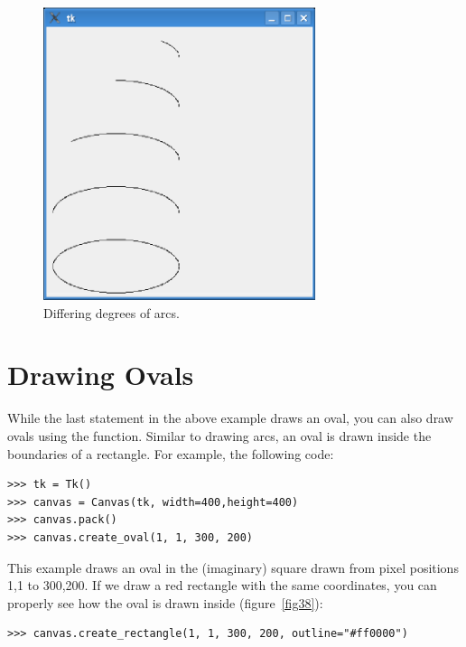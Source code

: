 \begin{figure}
\begin{center}
\includegraphics[width=80mm]{eps/figure37.eps}
\end{center}
\caption{Differing degrees of arcs.}\label{fig37}
\end{figure}

\section{Drawing Ovals}

While the last statement in the above example draws an oval, you can also draw ovals using the  function.  Similar to drawing arcs, an oval is drawn inside the boundaries of a rectangle. For example, the following code:

\begin{listing}
\begin{verbatim}
>>> tk = Tk()
>>> canvas = Canvas(tk, width=400,height=400)
>>> canvas.pack()
>>> canvas.create_oval(1, 1, 300, 200)
\end{verbatim}
\end{listing}

This example draws an oval in the (imaginary) square drawn from pixel positions 1,1 to 300,200. If we draw a red rectangle with the same coordinates, you can properly see how the oval is drawn inside (figure~\ref{fig38}):

\begin{listing}
\begin{verbatim}
>>> canvas.create_rectangle(1, 1, 300, 200, outline="#ff0000")
\end{verbatim}
\end{listing}

